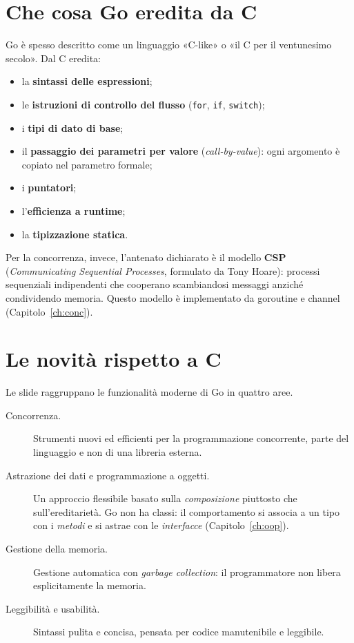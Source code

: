 \documentclass[11pt,a4paper]{report}
\newcommand{\cod}[1]{\texttt{#1}}
\begin{document}
\section{Che cosa Go eredita da C}

Go è spesso descritto come un linguaggio «C-like» o «il C per il ventunesimo
secolo». Dal C eredita:

\begin{itemize}
  \item la \textbf{sintassi delle espressioni};
  \item le \textbf{istruzioni di controllo del flusso} (\cod{for}, \cod{if}, \cod{switch});
  \item i \textbf{tipi di dato di base};
  \item il \textbf{passaggio dei parametri per valore} (\emph{call-by-value}):
        ogni argomento è copiato nel parametro formale;
  \item i \textbf{puntatori};
  \item l'\textbf{efficienza a runtime};
  \item la \textbf{tipizzazione statica}.
\end{itemize}

Per la concorrenza, invece, l'antenato dichiarato è il modello \textbf{CSP}
(\emph{Communicating Sequential Processes}, formulato da Tony Hoare): processi
sequenziali indipendenti che cooperano scambiandosi messaggi anziché condividendo
memoria. Questo modello è implementato da goroutine e channel
(Capitolo~\ref{ch:conc}).

\section{Le novità rispetto a C}

Le slide raggruppano le funzionalità moderne di Go in quattro aree.

\begin{description}
  \item[Concorrenza.] Strumenti nuovi ed efficienti per la programmazione
        concorrente, parte del linguaggio e non di una libreria esterna.
  \item[Astrazione dei dati e programmazione a oggetti.] Un approccio flessibile
        basato sulla \emph{composizione} piuttosto che sull'ereditarietà. Go non ha
        classi: il comportamento si associa a un tipo con i \emph{metodi}
        e si astrae con le \emph{interfacce} (Capitolo~\ref{ch:oop}).
  \item[Gestione della memoria.] Gestione automatica con \emph{garbage
        collection}: il programmatore non libera esplicitamente la memoria.
  \item[Leggibilità e usabilità.] Sintassi pulita e concisa, pensata per codice
        manutenibile e leggibile.
\end{description}
\end{document}
